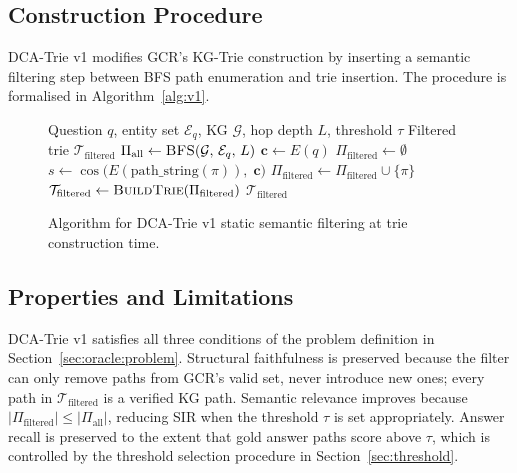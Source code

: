 \subsection{Construction Procedure}

DCA-Trie v1 modifies GCR's KG-Trie construction by inserting a semantic filtering step between BFS path enumeration and trie insertion. The procedure is formalised in Algorithm~\ref{alg:v1}.

\begin{figure}[H]
    \begin{algorithm}[H]
        \caption{DCA-Trie v1 --- Static Semantic Filtering}
        \label{alg:v1}
        \begin{algorithmic}[1]
            \Require Question $q$, entity set $\mathcal{E}_q$, KG $\mathcal{G}$, hop depth $L$, threshold $\tau$
            \Ensure Filtered trie $\mathcal{T}_{\text{filtered}}$
            \State $\Pi_{\text{all}} \leftarrow \textsc{BFS}(\mathcal{G},\, \mathcal{E}_q,\, L)$
            \State $\mathbf{c} \leftarrow E(q)$
            \State $\Pi_{\text{filtered}} \leftarrow \emptyset$
            \State $s \leftarrow \cos\!\bigl(E(\text{path\_string}(\pi)),\; \mathbf{c}\bigr)$
            \State $\Pi_{\text{filtered}} \leftarrow \Pi_{\text{filtered}} \cup \{\pi\}$
            \EndIf
            \EndFor
            \State $\mathcal{T}_{\text{filtered}} \leftarrow \textsc{BuildTrie}(\Pi_{\text{filtered}})$
            \State \Return $\mathcal{T}_{\text{filtered}}$
        \end{algorithmic}
    \end{algorithm}
    \caption{Algorithm for DCA-Trie v1 static semantic filtering at trie construction time.}
    \label{fig:alg_v1}
\end{figure}

\subsection{Properties and Limitations}

DCA-Trie v1 satisfies all three conditions of the problem definition in Section~\ref{sec:oracle:problem}. Structural faithfulness is preserved because the filter can only remove paths from GCR's valid set, never introduce new ones; every path in $\mathcal{T}_{\text{filtered}}$ is a verified KG path. Semantic relevance improves because $|\Pi_{\text{filtered}}| \leq |\Pi_{\text{all}}|$, reducing SIR when the threshold $\tau$ is set appropriately. Answer recall is preserved to the extent that gold answer paths score above $\tau$, which is controlled by the threshold selection procedure in Section~\ref{sec:threshold}.

